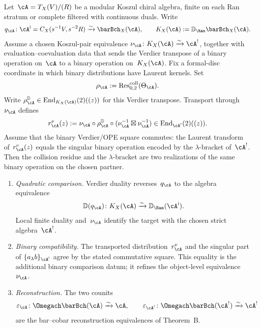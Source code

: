 \begin{theorem}
\label{thm:r-matrix-koszul-dual-inverse}
Let~$\cA=T_X(V)/(R)$ be a modular Koszul chiral algebra, finite on
each Ran stratum or complete filtered with continuous duals.  Write
\[
q_\cA\colon\cA^{\mathrm i}=C_X(s^{-1}V,s^{-2}R)\xrightarrow{\sim}
\barBch_X(\cA),
\qquad
K_X(\cA):=\mathbb D_{\Ran}\barBch_X(\cA).
\]
Assume a chosen Koszul-pair equivalence
$\nu_\cA\colon K_X(\cA)\xrightarrow{\sim}\cA^!$, together with
evaluation--coevaluation data that sends the Verdier transpose of a
binary operation on~$\cA$ to a binary operation on~$K_X(\cA)$.
Fix a formal-disc coordinate in which binary distributions have
Laurent kernels.  Set
\[
\rho_\cA:=\operatorname{Res}^{\mathrm{coll}}_{0,2}(\Theta_\cA).
\]
Write $\rho_\cA^{\mathbb D}\in
\mathrm{End}_{K_X(\cA)}(2)((z))$ for this Verdier transpose.  Transport
through~$\nu_\cA$ defines
\begin{equation}\label{eq:r-matrix-koszul-inverse-def}
r_\cA^\nu(z):=
\nu_\cA\circ\rho_\cA^{\mathbb D}\circ
(\nu_\cA^{-1}\boxtimes\nu_\cA^{-1})
\in \mathrm{End}_{\cA^!}(2)((z)).
\end{equation}
Assume that the binary Verdier/OPE square commutes: the Laurent
transform of~$r_\cA^\nu(z)$ equals the singular binary operation
encoded by the $\lambda$-bracket of~$\cA^!$.  Then the collision
residue and the $\lambda$-bracket are two realizations of the same
binary operation on the chosen partner.

\begin{enumerate}[label=\textup{(\roman*)}]
\item \emph{Quadratic comparison.}
 Verdier duality reverses~$q_\cA$ to the algebra equivalence
 \[
 \mathbb D(q_\cA)\colon K_X(\cA)\xrightarrow{\sim}
 \mathbb D_{\Ran}(\cA^{\mathrm i}).
 \]
 Local finite duality and~$\nu_\cA$ identify the target with the
 chosen strict algebra~$\cA^!$.

\item \emph{Binary compatibility.}
 The transported distribution~$r_\cA^\nu$ and the singular part of
 $\{a_\lambda b\}_{\cA^!}$ agree by the stated commutative square.
 This equality is the additional binary comparison datum; it refines
 the object-level equivalence~$\nu_\cA$.

\item \emph{Reconstruction.}
 The two counits
 \[
 \varepsilon_\cA\colon\Omegach\barBch(\cA)\xrightarrow{\sim}\cA,
 \qquad
 \varepsilon_{\cA^!}\colon
 \Omegach\barBch(\cA^!)\xrightarrow{\sim}\cA^!
 \]
 are the bar--cobar reconstruction equivalences of Theorem~B.
\end{enumerate}
\end{theorem}

